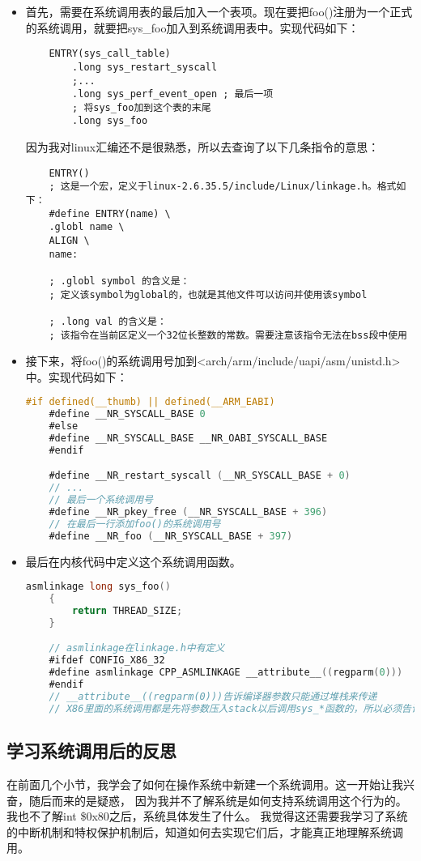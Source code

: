 \documentclass[a4paper,left=2.5cm,right=2.5cm,11pt]{article}
\begin{document}
\begin{itemize}
	\item 首先，需要在系统调用表的最后加入一个表项。现在要把foo()注册为一个正式的系统调用，就要把sys\_foo加入到系统调用表中。实现代码如下：
	\begin{lstlisting}
	ENTRY(sys_call_table)
		.long sys_restart_syscall
		;...
		.long sys_perf_event_open ; 最后一项
		; 将sys_foo加到这个表的末尾
		.long sys_foo
	\end{lstlisting}

	因为我对linux汇编还不是很熟悉，所以去查询了以下几条指令的意思：
	\begin{lstlisting}
	ENTRY()
	; 这是一个宏，定义于linux-2.6.35.5/include/Linux/linkage.h。格式如下：
	#define ENTRY(name) \
	.globl name \
	ALIGN \
	name:

	; .globl symbol 的含义是：
	; 定义该symbol为global的，也就是其他文件可以访问并使用该symbol

	; .long val 的含义是：
	; 该指令在当前区定义一个32位长整数的常数。需要注意该指令无法在bss段中使用
	\end{lstlisting}

	\item 接下来，将foo()的系统调用号加到<arch/arm/include/uapi/asm/unistd.h>中。实现代码如下：
	\begin{lstlisting}[language=C]
	#if defined(__thumb) || defined(__ARM_EABI)
	#define __NR_SYSCALL_BASE 0
	#else
	#define __NR_SYSCALL_BASE __NR_OABI_SYSCALL_BASE
	#endif

	#define __NR_restart_syscall (__NR_SYSCALL_BASE + 0)
	// ...
	// 最后一个系统调用号
	#define __NR_pkey_free (__NR_SYSCALL_BASE + 396)
	// 在最后一行添加foo()的系统调用号
	#define __NR_foo (__NR_SYSCALL_BASE + 397)
	\end{lstlisting}

	\item 最后在内核代码中定义这个系统调用函数。
	\begin{lstlisting}[language=C]
	asmlinkage long sys_foo()
	{
		return THREAD_SIZE;
	}

	// asmlinkage在linkage.h中有定义
	#ifdef CONFIG_X86_32
	#define asmlinkage CPP_ASMLINKAGE __attribute__((regparm(0)))
	#endif
	// __attribute__((regparm(0)))告诉编译器参数只能通过堆栈来传递
	// X86里面的系统调用都是先将参数压入stack以后调用sys_*函数的，所以必须告诉编译器只能通过堆栈传递参数
	\end{lstlisting}
\end{itemize}
\subsection{学习系统调用后的反思}
	在前面几个小节，我学会了如何在操作系统中新建一个系统调用。这一开始让我兴奋，随后而来的是疑惑，
	因为我并不了解系统是如何支持系统调用这个行为的。我也不了解int \$0x80之后，系统具体发生了什么。
	我觉得这还需要我学习了系统的中断机制和特权保护机制后，知道如何去实现它们后，才能真正地理解系统调用。
\end{document}
